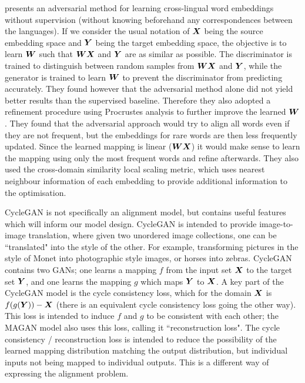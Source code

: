 \cite{wordtranslationwithoutparalleldata} presents an adversarial method for learning cross-lingual word embeddings without supervision (without knowing beforehand any correspondences between the languages). If we consider the usual notation of $\boldsymbol{X}$ being the source embedding space and $\boldsymbol{Y}$ being the target embedding space, the objective is to learn $\boldsymbol{W}$ such that $\boldsymbol{W} \boldsymbol{X}$ and $\boldsymbol{Y}$ are as similar as possible. The discriminator is trained to distinguish between random samples from $\boldsymbol{W} \boldsymbol{X}$ and $\boldsymbol{Y}$, while the generator is trained to learn $\boldsymbol{W}$ to prevent the discriminator from predicting accurately. They found however that the adversarial method alone did not yield better results than the supervised baseline. Therefore they also adopted a refinement procedure using Procrustes analysis to further improve the learned $\boldsymbol{W}$. They found that the adversarial approach would try to align all words even if they are not frequent, but the embeddings for rare words are then less frequently updated. Since the learned mapping is linear ($\boldsymbol{W} \boldsymbol{X}$) it would make sense to learn the mapping using only the most frequent words and refine afterwards. They also used the cross-domain similarity local scaling metric, which uses nearest neighbour information of each embedding to provide additional information to the optimisation.

CycleGAN \cite{CycleGAN} is not specifically an alignment model, but contains useful features which will inform our model design. CycleGAN is intended to provide image-to-image translation, where given two unordered image collections, one can be ``translated" into the style of the other. For example, transforming pictures in the style of Monet into photographic style images, or horses into zebras. CycleGAN contains two GANs; one learns a mapping $f$ from the input set $\boldsymbol{X}$ to the target set $\boldsymbol{Y}$, and one learns the mapping $g$ which maps $\boldsymbol{Y}$ to $\boldsymbol{X}$. A key part of the CycleGAN model is the cycle consistency loss, which for the domain $\boldsymbol{X}$ is $f(g(\boldsymbol{Y})) - \boldsymbol{X}$ (there is an equivalent cycle consistency loss going the other way). This loss is intended to induce $f$ and $g$ to be consistent with each other; the MAGAN model also uses this loss, calling it ``reconstruction loss". The cycle consistency / reconstruction loss is intended to reduce the possibility of the learned mapping distribution matching the output distribution, but individual inputs not being mapped to individual outputs. This is a different way of expressing the alignment problem. 


